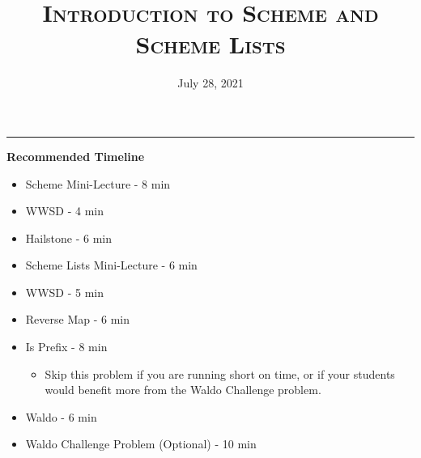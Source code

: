 \documentclass{exam}
\title{\textsc{Introduction to Scheme and Scheme Lists}}
\date{July 28, 2021}
\begin{document}
\maketitle
\rule{\textwidth}{0.15em}
\fontsize{12}{15}\selectfont
\begin{blocksection}
\begin{guide}
\textbf{Recommended Timeline}
\begin{itemize}
  \item Scheme Mini-Lecture - 8 min
  \item WWSD - 4 min
  \item Hailstone - 6 min
  \item Scheme Lists Mini-Lecture - 6 min
  \item WWSD - 5 min
  \item Reverse Map - 6 min
  \item Is Prefix - 8 min
  \begin{itemize}
    \item Skip this problem if you are running short on time, or if your students would benefit more from the Waldo Challenge problem.
  \end{itemize}
  \item Waldo - 6 min
  \item Waldo Challenge Problem (Optional) - 10 min
\end{itemize}
\end{guide}
\end{blocksection}
\end{document}
